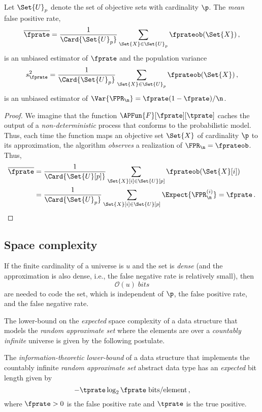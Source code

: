 \documentclass[ ../main.tex]{subfiles}
\newcommand{\ctor}[2]{\APFun{F}[#1][#2]}
\begin{document}
Let $\Set{U}_p$ denote the set of objective sets with cardinality $\p$.
The \emph{mean} false positive rate,
\begin{equation}
    \overline{\fprate} = \frac{1}{\Card{\Set{U}_p}}
        \sum_{\Set{X} \in \Set{U}_p} \fprateob(\Set{X})\,,
\end{equation}
is an unbiased estimator of $\fprate$ and the population variance
\begin{equation}
    s^2_\fprate = \frac{1}{\Card{\Set{U}_p}}
        \sum_{\Set{X} \in \Set{U}_p} \fprateob(\Set{X})\,,
\end{equation}
is an unbiased estimator of $\Var{\FPR_\n} = \fprate(1-\fprate)/\n$.
\begin{proof}
We imagine that the function $\ctor{\fprate}{\tprate}$ caches the output of a \emph{non-deterministic} process that conforms to the probabilistic model.
Thus, each time the function maps an objective set $\Set{X}$ of cardinality $\p$ to its approximation, the algorithm \emph{observes} a realization of 
$\FPR_\n = \fprateob$.
Thus,
\begin{align}
    \overline{\fprate}
        &= \frac{1}{\Card{\Set{U}[p]}} 
            \sum_{\Set{X}[i] \in \Set{U}[p]} \fprateob(\Set{X}[i])\\
        &= \frac{1}{\Card{\Set{U}_p}} 
            \sum_{\Set{X}[i] \in \Set{U}[p]} \Expect{\FPR_\n^{(i)}} = \fprate\,.
\end{align}
\end{proof}

\subsection{Space complexity}
\label{sec:space_comp}
If the finite cardinality of a universe is $u$ and the set is \emph{dense} (and the approximation is also dense, i.e., the false negative rate is relatively 
small), then
\begin{equation}
    \mathcal{O}(u) \; \si{bits}
\end{equation}
are needed to code the set, which is independent of $\p$, the false positive rate, and the false negative rate.

The lower-bound on the \emph{expected} space complexity of a data structure that models the \emph{random approximate set} where the elements are over a \emph{countably infinite} universe is given by the following postulate.
\begin{postulate}
\label{pst:approx_l_b}
The \emph{information-theoretic lower-bound} of a data structure that implements the countably infinite \emph{random approximate set} abstract data type has an \emph{expected} bit length given by
\begin{equation}
    -\tprate \log_2 \fprate \; \si{bits \per element}\,,
\end{equation}
where $\fprate > 0$ is the false positive rate and $\tprate$ is the true positive.
\end{postulate}
\end{document}
